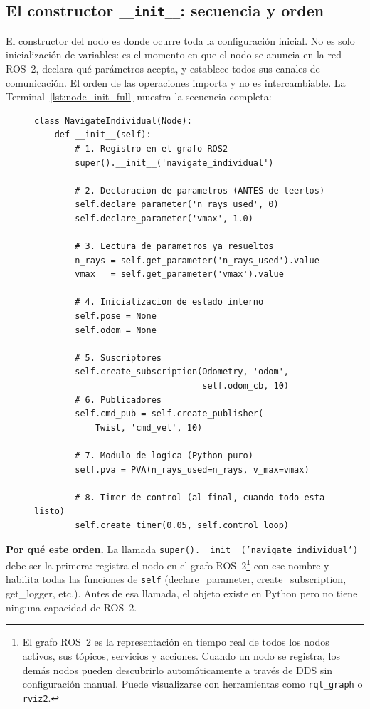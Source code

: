 \subsection{El constructor \texttt{\_\_init\_\_}: secuencia y orden}

El constructor del nodo es donde ocurre toda la configuración inicial. No es solo inicialización de variables: es el momento en que el nodo se anuncia en la red ROS~2, declara qué parámetros acepta, y establece todos sus canales de comunicación. El orden de las operaciones importa y no es intercambiable. La Terminal~\ref{lst:node_init_full} muestra la secuencia completa:

\begin{figure}[H]
\centering
\begin{lstlisting}[style=python, caption={Constructor completo de un nodo ROS~2 con parámetros, suscriptores y timer.}, label={lst:node_init_full}]
class NavigateIndividual(Node):
    def __init__(self):
        # 1. Registro en el grafo ROS2
        super().__init__('navigate_individual')

        # 2. Declaracion de parametros (ANTES de leerlos)
        self.declare_parameter('n_rays_used', 0)
        self.declare_parameter('vmax', 1.0)

        # 3. Lectura de parametros ya resueltos
        n_rays = self.get_parameter('n_rays_used').value
        vmax   = self.get_parameter('vmax').value

        # 4. Inicializacion de estado interno
        self.pose = None
        self.odom = None

        # 5. Suscriptores
        self.create_subscription(Odometry, 'odom',
                                 self.odom_cb, 10)
        # 6. Publicadores
        self.cmd_pub = self.create_publisher(
            Twist, 'cmd_vel', 10)

        # 7. Modulo de logica (Python puro)
        self.pva = PVA(n_rays_used=n_rays, v_max=vmax)

        # 8. Timer de control (al final, cuando todo esta listo)
        self.create_timer(0.05, self.control_loop)
\end{lstlisting}
\end{figure}

\textbf{Por qué este orden.} La llamada \texttt{super().\_\_init\_\_('navigate\_individual')} debe ser la primera: registra el nodo en el grafo ROS~2\footnote{El grafo ROS~2 es la representación en tiempo real de todos los nodos activos, sus tópicos, servicios y acciones. Cuando un nodo se registra, los demás nodos pueden descubrirlo automáticamente a través de DDS sin configuración manual. Puede visualizarse con herramientas como \texttt{rqt\_graph} o \texttt{rviz2}.} con ese nombre y habilita todas las funciones de \texttt{self} (declare\_parameter, create\_subscription, get\_logger, etc.). Antes de esa llamada, el objeto existe en Python pero no tiene ninguna capacidad de ROS~2.

